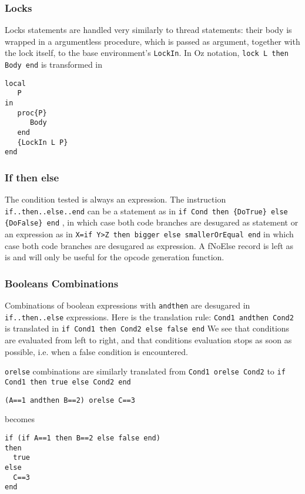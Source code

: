 \documentclass[a4paper]{memoir}
\begin{document}
\subsubsection{Locks}
Locks statements are handled very similarly to thread statements: their body is
wrapped in a argumentless procedure, which is passed as argument, together with
the lock itself, to the base environment's \lstinline!LockIn!. In Oz notation, \lstinline!lock L then Body end! is transformed in
\begin{lstlisting}
local
   P
in
   proc{P}
      Body
   end
   {LockIn L P}
end
\end{lstlisting}


\subsubsection{If then else}
The condition tested is always an expression.
The instruction \lstinline!if..then..else..end! can be a statement as in 
\lstinline!if Cond then {DoTrue} else {DoFalse} end!
, in which case both code branches are desugared as statement
or an expression as in
\lstinline!X=if Y>Z then bigger else smallerOrEqual end!
in which case both code branches are desugared as expression.
A fNoElse record is left as is and will only be useful for the opcode generation function.

\subsubsection{Booleans Combinations}
Combinations of boolean expressions with \lstinline!andthen! are desugared in
\lstinline!if..then..else! expressions. Here is the translation
rule:
\lstinline!Cond1 andthen Cond2! is translated in \lstinline!if Cond1 then Cond2 else false end! 
We see that conditions are evaluated from left to right, and that conditions
evaluation stops as soon as possible, i.e. when a false condition is
encountered.

\lstinline!orelse! combinations are similarly translated from \lstinline!Cond1 orelse Cond2! to \lstinline!if Cond1 then true else Cond2 end!  
\begin{lstlisting}
(A==1 andthen B==2) orelse C==3
\end{lstlisting}
becomes

\begin{lstlisting}
if (if A==1 then B==2 else false end)
then
  true
else
  C==3
end
\end{lstlisting}
\end{document}

